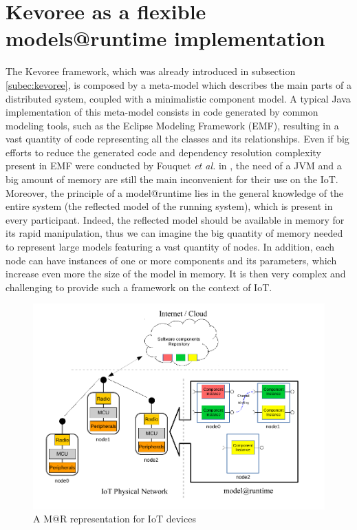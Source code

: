 \section{Kevoree as a flexible models@runtime implementation}
\label{sec:MAR_overview}
The Kevoree framework, which was already introduced in subsection \ref{subec:kevoree}, is composed by a meta-model which describes the main parts of a distributed system, coupled with a minimalistic component model.
A typical Java implementation of this meta-model consists in code generated by common modeling tools, such as the Eclipse Modeling Framework (EMF)\cite{steinberg2008emf}, resulting in a vast quantity of code representing all the classes and its relationships.
Even if big efforts to reduce the generated code and dependency resolution complexity present in EMF were conducted by Fouquet \textit{et al.} in \cite{fouquet2012eclipse}, the need of a JVM and a big amount of memory are still the main inconvenient for their use on the IoT.
Moreover, the principle of a model@runtime lies in the general knowledge of the entire system (the reflected model of the running system), which is present in every participant.
Indeed, the reflected model should be available in memory for its rapid manipulation, thus we can imagine the big quantity of memory needed to represent large models featuring a vast quantity of nodes.
In addition, each node can have instances of one or more components and its parameters, which increase even more the size of the model in memory.
It is then very complex and challenging to provide such a framework on the context of IoT.

\begin{figure}[]
	\centering
	\includegraphics[width=1\columnwidth]{chapters/modelsAtRuntimeContiki.images/MAR_IOT.pdf}
	\caption{A M@R representation for IoT devices}
	\label{fig:MAR_IOT}
\end{figure}

